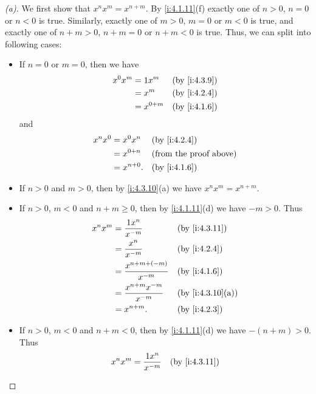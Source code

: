 \begin{proof}[(a)]
  We first show that \(x^n x^m = x^{n + m}\).
  By \cref{i:4.1.11}(f) exactly one of \(n > 0\), \(n = 0\) or \(n < 0\) is true.
  Similarly, exactly one of \(m > 0\), \(m = 0\) or \(m < 0\) is true, and exactly one of \(n + m > 0\), \(n + m = 0\) or \(n + m < 0\) is true.
  Thus, we can split into following cases:
  \begin{itemize}
    \item If \(n = 0\) or \(m = 0\), then we have
          \begin{align*}
            x^0 x^m & = 1 x^m     &  & \by{i:4.3.9} \\
                    & = x^m       &  & \by{i:4.2.4} \\
                    & = x^{0 + m} &  & \by{i:4.1.6}
          \end{align*}
          and
          \begin{align*}
            x^n x^0 & = x^0 x^n    &  & \by{i:4.2.4}                  \\
                    & = x^{0 + n}  &  & \text{(from the proof above)} \\
                    & = x^{n + 0}. &  & \by{i:4.1.6}
          \end{align*}
    \item If \(n > 0\) and \(m > 0\), then by \cref{i:4.3.10}(a) we have \(x^n x^m = x^{n + m}\).
    \item If \(n > 0\), \(m < 0\) and \(n + m \geq 0\), then by \cref{i:4.1.11}(d) we have \(-m > 0\).
          Thus
          \begin{align*}
            x^n x^m & = \dfrac{1 x^n}{x^{-m}}            &  & \by{i:4.3.11}    \\
                    & = \dfrac{x^n}{x^{-m}}              &  & \by{i:4.2.4}     \\
                    & = \dfrac{x^{n + m + (-m)}}{x^{-m}} &  & \by{i:4.1.6}     \\
                    & = \dfrac{x^{n + m} x^{-m}}{x^{-m}} &  & \by{i:4.3.10}[a] \\
                    & = x^{n + m}.                       &  & \by{i:4.2.3}
          \end{align*}
    \item If \(n > 0\), \(m < 0\) and \(n + m < 0\), then by \cref{i:4.1.11}(d) we have \(-(n + m) > 0\).
          Thus
          \begin{align*}
            x^n x^m & = \dfrac{1 x^n}{x^{-m}}              &  & \by{i:4.3.11}    \\

\end{align*}
\end{itemize}
\end{proof}

